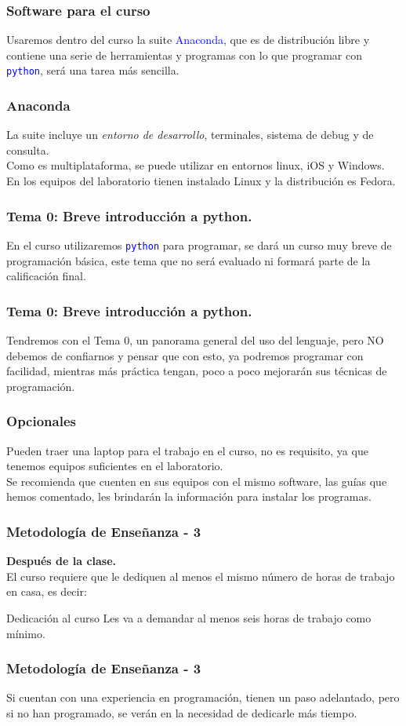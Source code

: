 \documentclass[12pt]{beamer}
\newcommand{\python}{\texttt{python}}
\newcommand{\textoazul}[1]{\textcolor{blue}{#1}}
\begin{document}
\begin{frame}
\frametitle{Software para el curso}
Usaremos dentro del curso la suite \textoazul{Anaconda}, que es de distribución libre y contiene una serie de herramientas y programas con lo que programar con \textoazul{\python}, será una tarea más sencilla.
\end{frame}
\begin{frame}
\frametitle{Anaconda}
La suite incluye un \emph{entorno de desarrollo}, terminales, sistema de debug y de consulta.
\\
\bigskip
Como es multiplataforma, se puede utilizar en entornos linux, iOS y Windows. En los equipos del laboratorio tienen instalado Linux y la distribución es Fedora.
\end{frame}
\begin{frame}
\frametitle{Tema 0: Breve introducción a python.}
En el curso utilizaremos \textoazul{\python} para programar, se dará un curso muy breve de programación básica, este tema que no será evaluado ni formará parte de la calificación final.
\end{frame}
\begin{frame}
\frametitle{Tema 0: Breve introducción a python.}
Tendremos con el Tema 0, un panorama general del uso del lenguaje, pero NO debemos de confiarnos y pensar que con esto, ya podremos programar con facilidad, mientras más práctica tengan, poco a poco mejorarán sus técnicas de programación.
\end{frame}
\begin{frame}
\frametitle{Opcionales}
Pueden traer una laptop para el trabajo en el curso, no es requisito, ya que tenemos equipos suficientes en el laboratorio.
\\
\medskip
Se recomienda que cuenten en sus equipos con el mismo software, las guías que hemos comentado, les brindarán la información para instalar los programas.
\end{frame}
\begin{frame}
\frametitle{Metodología de Enseñanza - 3}
\textbf{Después de la clase.}
\\
\medskip
El curso \alert{requiere que le dediquen al menos el mismo número de horas de trabajo en casa}, es decir:
\pause
\begin{exampleblock}{Dedicación al curso}
Les va a demandar al menos seis horas de trabajo como mínimo.
\end{exampleblock}
\end{frame}
\begin{frame}
\frametitle{Metodología de Enseñanza - 3}
Si cuentan con una experiencia en programación, tienen un paso adelantado, pero si no han programado, se verán en la necesidad de dedicarle más tiempo.
\end{frame}
\end{document}
